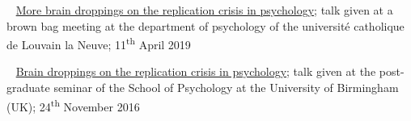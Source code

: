 




\textbullet~ \href{https://osf.io/vu327/}{More brain droppings on the replication crisis in psychology};
talk given at a brown bag meeting at the department of psychology of the université catholique de Louvain la Neuve;
11\textsuperscript{th} April 2019

\textbullet~ \href{https://dx.doi.org/10.6084/m9.figshare.4257992.v1}{Brain droppings on the replication crisis in psychology}; talk given at the post-graduate seminar of the School of Psychology at the University of Birmingham (UK);
24\textsuperscript{th} November 2016
